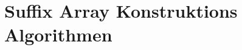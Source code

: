 \chapter{Suffix Array Konstruktions Algorithmen}

\newpage

\newpage

\newpage

\newpage

\newpage

\newpage

\newpage

\newpage

\newpage

\newpage

\newpage

\newpage

\newpage
%
